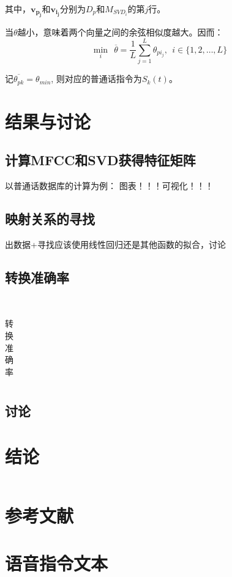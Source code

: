 \documentclass[lang=cn,cite=super]{elegantpaper}
\begin{document}
其中，$\bm{v_{p_j}}$和$\bm{v_{i_j}}$分别为$D_p$和$M_{SVD_i}$的第$j$行。

当$\theta$越小，意味着两个向量之间的余弦相似度越大。因而：
\begin{equation}
    \mathop{\min}_{i} ~~\overline{\theta} = \dfrac{1}{L} \sum_{j=1}^{L} \theta_{pi_{j}}, ~~i \in \{1,2,\ldots, L\}
\end{equation}

记$\overline{\theta_{pk}} = \theta_{min}$, 则对应的普通话指令为$S_k(t)$。
\section{结果与讨论}
\subsection{计算MFCC和SVD获得特征矩阵}
以普通话数据库的计算为例：
图表！！！可视化！！！
\subsection{映射关系的寻找}
出数据+寻找应该使用线性回归还是其他函数的拟合，讨论
\subsection{转换准确率}
\begin{table}[h]
    \caption{\label{tab:3} 转换准确率}\
    \begin{center}
        \begin{tabular}{cc}
            \hline
            \hline
        \end{tabular}
    \end{center}
\end{table}
\subsection{讨论}

\section{结论}

\begin{equation}
\end{equation}
\section{参考文献}
\appendix
\section{语音指令文本}
\label{appendix:A}
\end{document}
